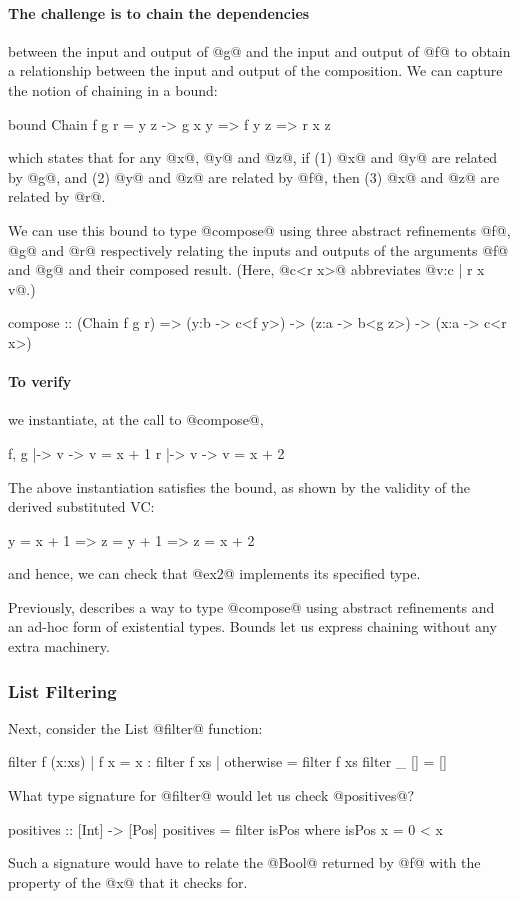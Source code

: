 \paragraph{The challenge is to chain the dependencies} between the
input and output of @g@ and the input and output of @f@ to 
obtain a relationship between the input and output of the 
composition. We can capture the notion of chaining in a bound:
%
\begin{code}
    bound Chain f g r = \x y z -> 
      g x y => f y z => r x z
\end{code}
%
which states that for any @x@, @y@ and @z@, if
%
(1) @x@ and @y@ are related by @g@, and
(2) @y@ and @z@ are related by @f@, then
(3) @x@ and @z@ are related by @r@.

We can use this bound to type @compose@ using three abstract 
refinements @f@, @g@ and @r@ respectively relating the inputs 
and outputs of the arguments @f@ and @g@ and their composed 
result. (Here, @c<r x>@ abbreviates @{v:c | r x v}@.)

\begin{code}
    compose :: (Chain f g r) => (y:b -> c<f y>) 
                             -> (z:a -> b<g z>) 
                             -> (x:a -> c<r x>)
\end{code}

\paragraph{To verify } we instantiate, at the call to @compose@,
%
\begin{code}
    f, g |-> \x v -> v = x + 1
       r |-> \x v -> v = x + 2
\end{code}
%
The above instantiation satisfies the bound, as shown by the validity 
of the derived substituted VC: 
%
\begin{code}
    y = x + 1 => z = y + 1 => z = x + 2
\end{code}
%
and hence, we can check that @ex2@ implements its specified type.

Previously, \cite{vazou13} describes a way to type @compose@ 
using abstract refinements and an ad-hoc form of existential 
types. Bounds let us express chaining without any extra machinery.


\subsubsection*{List Filtering}

Next, consider the List @filter@ function:
%
\begin{code}
    filter f (x:xs)
      | f x         = x : filter f xs
      | otherwise   = filter f xs
    filter _ []     = []
\end{code}
%
What type signature for @filter@ would let us check @positives@?
%
\begin{code}
    positives :: [Int] -> [Pos]
    positives = filter isPos  
      where
        isPos x = 0 < x
\end{code}
%
Such a signature would have to relate the @Bool@ returned by 
@f@ with the property of the @x@ that it checks for. 

